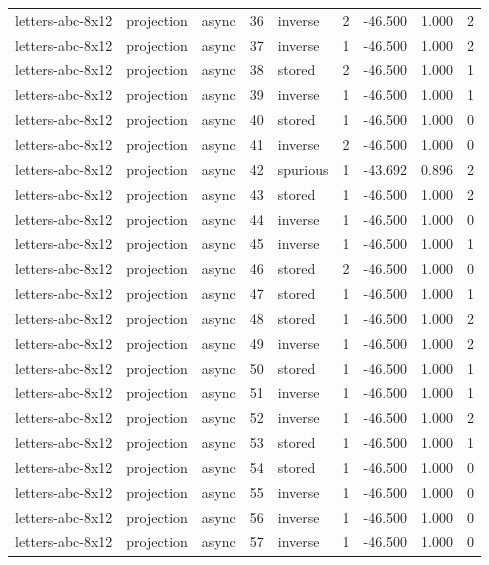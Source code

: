 \begin{tabular}{lllrlrrrr}
letters-abc-8x12 & projection & async & 36 & inverse & 2 & -46.500 & 1.000 & 2 \\
letters-abc-8x12 & projection & async & 37 & inverse & 1 & -46.500 & 1.000 & 2 \\
letters-abc-8x12 & projection & async & 38 & stored & 2 & -46.500 & 1.000 & 1 \\
letters-abc-8x12 & projection & async & 39 & inverse & 1 & -46.500 & 1.000 & 1 \\
letters-abc-8x12 & projection & async & 40 & stored & 1 & -46.500 & 1.000 & 0 \\
letters-abc-8x12 & projection & async & 41 & inverse & 2 & -46.500 & 1.000 & 0 \\
letters-abc-8x12 & projection & async & 42 & spurious & 1 & -43.692 & 0.896 & 2 \\
letters-abc-8x12 & projection & async & 43 & stored & 1 & -46.500 & 1.000 & 2 \\
letters-abc-8x12 & projection & async & 44 & inverse & 1 & -46.500 & 1.000 & 0 \\
letters-abc-8x12 & projection & async & 45 & inverse & 1 & -46.500 & 1.000 & 1 \\
letters-abc-8x12 & projection & async & 46 & stored & 2 & -46.500 & 1.000 & 0 \\
letters-abc-8x12 & projection & async & 47 & stored & 1 & -46.500 & 1.000 & 1 \\
letters-abc-8x12 & projection & async & 48 & stored & 1 & -46.500 & 1.000 & 2 \\
letters-abc-8x12 & projection & async & 49 & inverse & 1 & -46.500 & 1.000 & 2 \\
letters-abc-8x12 & projection & async & 50 & stored & 1 & -46.500 & 1.000 & 1 \\
letters-abc-8x12 & projection & async & 51 & inverse & 1 & -46.500 & 1.000 & 1 \\
letters-abc-8x12 & projection & async & 52 & inverse & 1 & -46.500 & 1.000 & 2 \\
letters-abc-8x12 & projection & async & 53 & stored & 1 & -46.500 & 1.000 & 1 \\
letters-abc-8x12 & projection & async & 54 & stored & 1 & -46.500 & 1.000 & 0 \\
letters-abc-8x12 & projection & async & 55 & inverse & 1 & -46.500 & 1.000 & 0 \\
letters-abc-8x12 & projection & async & 56 & inverse & 1 & -46.500 & 1.000 & 0 \\
letters-abc-8x12 & projection & async & 57 & inverse & 1 & -46.500 & 1.000 & 0 \\

\end{tabular}
